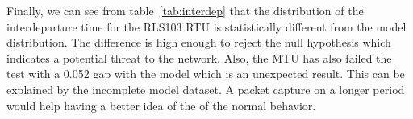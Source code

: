 \documentclass[12pt,journal,compsoc]{IEEEtran}
\begin{document}
\begin{empfile}
Finally, we can see from table~\ref{tab:interdep} that the distribution of the interdeparture time for the RLS103 RTU is statistically different from the model distribution. The difference is high enough to reject the null hypothesis which indicates a potential threat to the network. Also, the MTU has also failed the test with a 0.052 gap with the model which is an unexpected result. This can be explained by the incomplete model dataset. A packet capture on a longer period would help having a better idea of the of the normal behavior.
%
%



%
%



\end{empfile}
\end{document}
